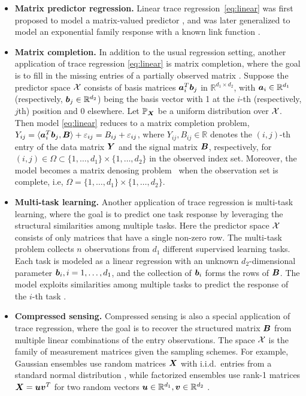 \documentclass[aos]{imsart}
\theoremstyle{definition}
\begin{document}
\begin{itemize}
\item{\bf Matrix predictor regression.} Linear trace regression~\eqref{eq:linear} was first proposed to model a matrix-valued predictor \citep{zhou2014regularized, wang2014network}, and was later generalized to model an exponential family response with a known link function \citep{wang2017generalized, fan2019generalized}. 
\smallskip

\item {\bf Matrix completion.} In addition to the usual regression setting, another application of trace regression \eqref{eq:linear} is matrix completion, where the goal is to fill in the missing entries of a partially observed matrix \citep{Cai2016}. Suppose the predictor space $\mathcal{X}$ consists of basis matrices $\bm{a}^T_i\bm{b}_j$ in $\mathbb{R}^{d_1\times d_2}$, with $\bm{a}_i\in\mathbb{R}^{d_1}$ (respectively, $\bm{b}_j\in\mathbb{R}^{d_2}$) being the basis vector with 1 at the $i$-th (respectively, $j$th) position and 0 elsewhere. Let $\mathbb{P}_{\bm X}$ be a uniform distribution over $\mathcal{X}$. Then model \eqref{eq:linear} reduces to a matrix completion problem, $Y_{ij}=\langle \bm{a}^T_i \bm{b}_j,\bm B \rangle +\varepsilon_{ij}= B_{ij}+\varepsilon_{ij}$, where $Y_{ij}, B_{ij}\in\mathbb{R}$ denotes the $(i,j)$-th entry of the data matrix $\bm Y$ and the signal matrix $\bm B$, respectively, for $(i,j) \in \Omega\subset \{1,\ldots,d_1\}\times\{1,\ldots,d_2\}$ in the observed index set. Moreover, the model becomes a matrix denosing problem~\citep{Ma2016} when the observation set is complete, i.e, $\Omega=\{1,\ldots,d_1\}\times\{1,\ldots,d_2\}$. 
\smallskip

\item {\bf Multi-task learning.} Another application of trace regression is multi-task learning, where the goal is to predict one task response by leveraging the structural similarities among multiple tasks. Here the predictor space $\mathcal{X}$ consists of only matrices that have a single non-zero row. The multi-task problem collects $n$ observations from $d_1$ different supervised learning tasks. Each task is modeled as a linear regression with an unknown $d_2$-dimensional parameter $\bm{b}_i, i=1,\ldots,d_1$, and the collection of $\bm{b}_i$ forms the rows of $\bm B$. The model exploits similarities among multiple tasks to predict the response of the $i$-th task \citep{caruana1997multitask,fan2019generalized}. 
\smallskip

\item {\bf Compressed sensing.} Compressed sensing is also a special application of trace regression, where the goal is to recover the structured matrix $\bm B$ from multiple linear combinations of the entry observations. The space $\mathcal{X}$ is the family of measurement matrices given the sampling schemes. For example, Gaussian ensembles use random matrices $\bm X$ with i.i.d.\ entries from a standard normal distribution \citep{candes2011tight}, while factorized ensembles use rank-1 matrices $\bm X=\bm{u}\bm{v}^T$ for two random vectors $\bm{u}\in\mathbb{R}^{d_1}, \bm{v}\in\mathbb{R}^{d_2}$ \cite{recht2010guaranteed}.
\end{itemize}
\end{document}
